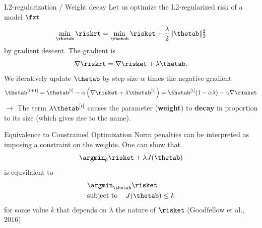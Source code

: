 \begin{vbframe}{L2-regularization / Weight decay}
Let us optimize the L2-regularized risk of a model $\fxt$
\[\min_{\thetab} \riskrt = \min_{\thetab} \risket + \frac{\lambda}{2} \|\thetab\|^2_2\]
by gradient descent. The gradient is
\[\nabla \riskrt = \nabla \risket + \lambda \thetab.\]
We iteratively update $\thetab$ by step size \(\alpha\) times the
negative gradient
\[\thetab^{[\text{t+1}]} = \thetab^{[\text{t}]} - \alpha \left(\nabla \risket + \lambda \thetab^{[\text{t}]}\right) =
\thetab^{[\text{t}]} (1 - \alpha \lambda) - \alpha \nabla \risket\]
$\to$ The term \(\lambda \thetab^{[t]}\) causes the parameter
(\textbf{weight}) to \textbf{decay} in proportion to its size (which gives rise to the name). 
\end{vbframe}


\begin{frame}{Equivalence to Constrained Optimization}
Norm penalties can be interpreted as imposing a constraint on the weights. One can show that 
 $$\argmin_{\theta} \risket + \lambda \text{\(J(\thetab)\)}$$
 is equvilalent to
 \begin{align*}
 & \argmin_{\thetab}  \risket \\
  &\text{subject to \;\;\;}  J(\thetab) \leq k
 \end{align*}
  for some value $k$ that depends on $\lambda$ the nature of 
 $\risket$ (Goodfellow et al., 2016)
\end{frame}

